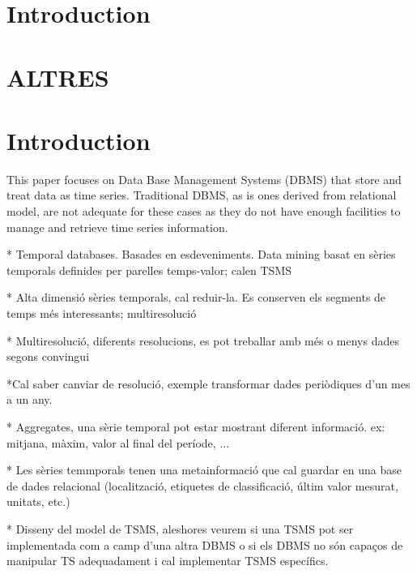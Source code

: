 \documentclass{acm_proc_article-sp}
\begin{document}



\section{Introduction}









\section{ALTRES}



\section{Introduction}

This paper focuses on Data Base Management Systems (DBMS) that store
and treat data as time series. Traditional DBMS, as is ones derived
from relational model, are not adequate for these cases as they do not
have enough facilities to manage and retrieve time series
information.



* Temporal databases. Basades en esdeveniments. Data mining basat en sèries temporals definides per parelles temps-valor; calen TSMS

* Alta dimensió sèries temporals, cal reduir-la. Es conserven els segments de temps més interessants; multiresolució

* Multiresolució, diferents resolucions, es pot treballar amb més o menys dades segons convingui

*Cal saber canviar de resolució, exemple transformar dades periòdiques d'un mes a un any.

* Aggregates, una sèrie temporal pot estar mostrant diferent informació. ex: mitjana, màxim, valor al final del període, ...

* Les sèries temmporals tenen una metainformació que cal guardar en una base de dades relacional (localització, etiquetes de classificació, últim valor mesurat, unitats, etc.)

* Disseny del model de TSMS, aleshores veurem si una TSMS pot ser implementada com a camp d'una altra DBMS o si els DBMS no són capaços de manipular TS adequadament i cal implementar TSMS específics.
\end{document}
